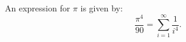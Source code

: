  An expression for $ \pi $ is given by:
\[ \frac{\pi ^4 }{90} = \sum _{i=1} ^{\infty} \frac{1}{i^4} . \]
